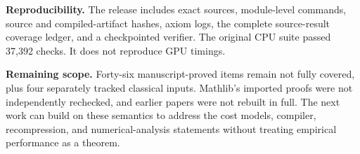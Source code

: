 \textbf{Reproducibility.} The release includes exact sources, module-level commands, source and compiled-artifact hashes, axiom logs, the complete source-result coverage ledger, and a checkpointed verifier. The original CPU suite passed 37,392 checks. It does not reproduce GPU timings.

\textbf{Remaining scope.} Forty-six manuscript-proved items remain not fully covered, plus four separately tracked classical inputs. Mathlib's imported proofs were not independently rechecked, and earlier papers were not rebuilt in full. The next work can build on these semantics to address the cost models, compiler, recompression, and numerical-analysis statements without treating empirical performance as a theorem.
